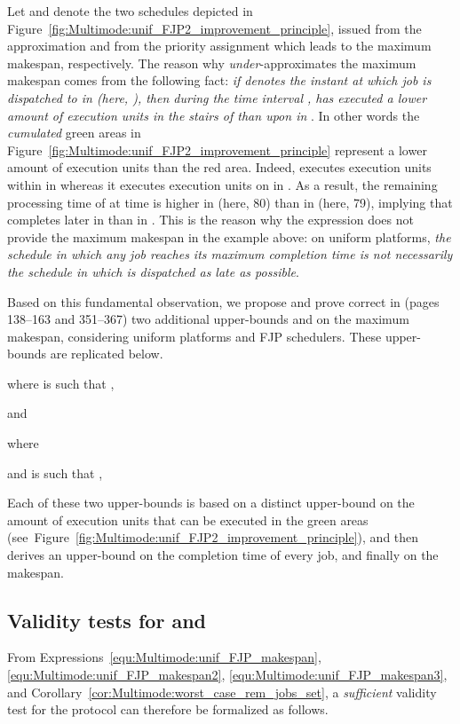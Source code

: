 \documentclass{article}
\newtheorem{validity test}{Validity Test}
\begin{document}
Let  and  denote the two schedules depicted in Figure~\ref{fig:Multimode:unif_FJP2_improvement_principle}, issued from the approximation  and from the priority assignment  which leads to the maximum makespan, respectively. The reason why  \emph{under}-approximates the maximum makespan comes from the following fact: \emph{if  denotes the instant at which job  is dispatched to   in  (here, ), then during the time interval ,  has executed a lower amount of execution units in the stairs of  than upon  in }. In other words the \emph{cumulated} green areas  in Figure~\ref{fig:Multimode:unif_FJP2_improvement_principle} represent a lower amount of execution units than the red area. Indeed,  executes  execution units within  in  whereas it executes  execution units on  in . As a result, the remaining processing time of  at time  is higher in  (here, 80) than in  (here, 79), implying that  completes later in  than in . This is the reason why the expression  does not provide the maximum makespan in the example above: on uniform platforms, \emph{the schedule in which any job  reaches its maximum completion time is not necessarily the schedule in which  is dispatched as late as possible}. 

Based on this fundamental observation, we propose and prove correct in \cite{Nelis:10} (pages 138--163 and 351--367) two additional upper-bounds  and  on the maximum makespan, considering uniform platforms and FJP schedulers. These upper-bounds are replicated below.

where  is such that ,

\noindent and

where 

and  is such that ,


Each of these two upper-bounds is based on a distinct upper-bound on the amount of execution units that can be executed in the green areas (see~Figure~\ref{fig:Multimode:unif_FJP2_improvement_principle}), and then derives an upper-bound on the completion time of every job, and finally on the makespan.

\subsection{Validity tests for  and }
\label{sec:Multimode:unif_FJP_validity_test}

\noindent From Expressions~\ref{equ:Multimode:unif_FJP_makespan}, \ref{equ:Multimode:unif_FJP_makespan2}, \ref{equ:Multimode:unif_FJP_makespan3}, and Corollary~\ref{cor:Multimode:worst_case_rem_jobs_set}, a \emph{sufficient} validity test for the protocol  can therefore be formalized as follows. 
\end{document}
